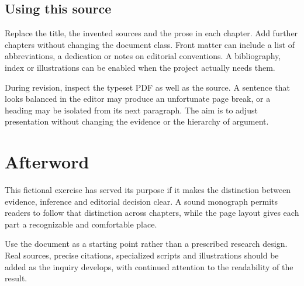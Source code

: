 \documentclass{impebook}
\begin{document}
\section{Using this source}
Replace the title, the invented sources and
the prose in each chapter. Add further chapters
without changing the document class. Front
matter can include a list of abbreviations,
a dedication or notes on editorial conventions.
A bibliography, index or illustrations can be
enabled when the project actually needs them.

During revision, inspect the typeset PDF as
well as the source. A sentence that looks
balanced in the editor may produce an
unfortunate page break, or a heading may be
isolated from its next paragraph. The aim is
to adjust presentation without changing
the evidence or the hierarchy of argument.

\backmatter
\chapter*{Afterword}
This fictional exercise has served its purpose
if it makes the distinction between evidence,
inference and editorial decision clear.
A sound monograph permits readers to follow
that distinction across chapters, while the
page layout gives each part a recognizable
and comfortable place.

Use the document as a starting point rather
than a prescribed research design. Real
sources, precise citations, specialized
scripts and illustrations should be added
as the inquiry develops, with continued
attention to the readability of the result.
\end{document}
